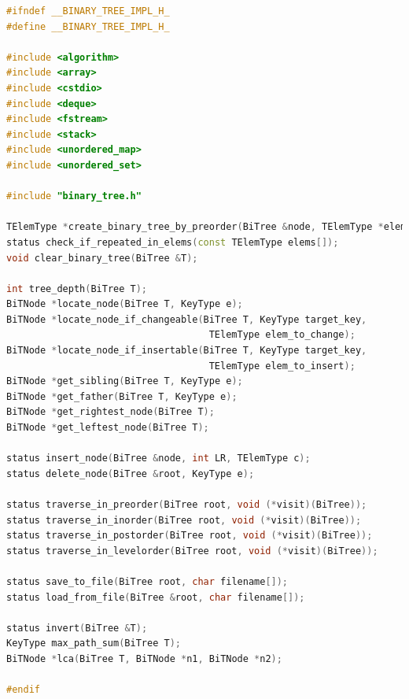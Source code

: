 \documentclass[supercite]{Experimental_Report}
\theoremstyle{definition}
\begin{document}
\begin{lstlisting}[caption={$binary\_tree\_impl.h$}, language=C++, frame=single]
#ifndef __BINARY_TREE_IMPL_H_
#define __BINARY_TREE_IMPL_H_

#include <algorithm>
#include <array>
#include <cstdio>
#include <deque>
#include <fstream>
#include <stack>
#include <unordered_map>
#include <unordered_set>

#include "binary_tree.h"

TElemType *create_binary_tree_by_preorder(BiTree &node, TElemType *elem);
status check_if_repeated_in_elems(const TElemType elems[]);
void clear_binary_tree(BiTree &T);

int tree_depth(BiTree T);
BiTNode *locate_node(BiTree T, KeyType e);
BiTNode *locate_node_if_changeable(BiTree T, KeyType target_key,
									TElemType elem_to_change);
BiTNode *locate_node_if_insertable(BiTree T, KeyType target_key,
									TElemType elem_to_insert);
BiTNode *get_sibling(BiTree T, KeyType e);
BiTNode *get_father(BiTree T, KeyType e);
BiTNode *get_rightest_node(BiTree T);
BiTNode *get_leftest_node(BiTree T);

status insert_node(BiTree &node, int LR, TElemType c);
status delete_node(BiTree &root, KeyType e);

status traverse_in_preorder(BiTree root, void (*visit)(BiTree));
status traverse_in_inorder(BiTree root, void (*visit)(BiTree));
status traverse_in_postorder(BiTree root, void (*visit)(BiTree));
status traverse_in_levelorder(BiTree root, void (*visit)(BiTree));

status save_to_file(BiTree root, char filename[]);
status load_from_file(BiTree &root, char filename[]);

status invert(BiTree &T);
KeyType max_path_sum(BiTree T);
BiTNode *lca(BiTree T, BiTNode *n1, BiTNode *n2);

#endif
	
\end{lstlisting}
\end{document}

